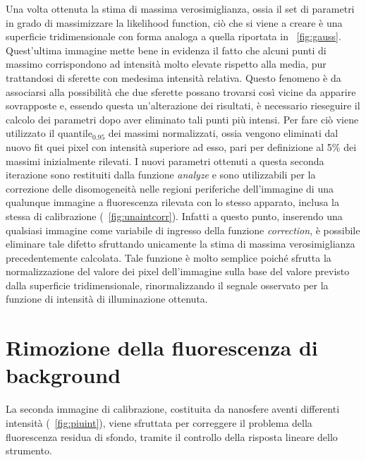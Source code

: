 Una volta ottenuta la stima di massima verosimiglianza, ossia il set di parametri in grado di massimizzare la likelihood function, ciò che si viene a creare è una superficie tridimensionale con forma analoga a quella riportata in \figurename~\ref{fig:gauss}. 
Quest'ultima immagine mette bene in evidenza il fatto che alcuni punti di massimo corrispondono ad intensità molto elevate rispetto alla media, pur trattandosi di sferette con medesima intensità relativa.
Questo fenomeno è da associarsi alla possibilità che due sferette possano trovarsi così vicine da apparire sovrapposte e, essendo questa un'alterazione dei risultati, è necessario rieseguire il calcolo dei parametri dopo aver eliminato tali punti più intensi. 
Per fare ciò viene utilizzato il quantile$_{0.95}$ dei massimi normalizzati, ossia vengono eliminati dal nuovo fit quei pixel con intensità superiore ad esso, pari per definizione al 5\% dei massimi inizialmente rilevati.
I nuovi parametri ottenuti a questa seconda iterazione sono restituiti dalla funzione \textit{analyze} e sono utilizzabili per la correzione delle disomogeneità nelle regioni periferiche dell'immagine di una qualunque immagine a fluorescenza rilevata con lo stesso apparato, inclusa la stessa di calibrazione (\figurename~\ref{fig:unaintcorr}).
Infatti a questo punto, inserendo una qualsiasi immagine come variabile di ingresso della funzione \textit{correction}, è possibile eliminare tale difetto sfruttando unicamente la stima di massima verosimiglianza precedentemente calcolata. 
Tale funzione è molto semplice poiché sfrutta la normalizzazione del valore dei pixel dell'immagine sulla base del valore previsto dalla superficie tridimensionale, rinormalizzando il segnale osservato per la funzione di intensità di illuminazione ottenuta.



\section{Rimozione della fluorescenza di background}

La seconda immagine di calibrazione, costituita da nanosfere aventi differenti intensità (\figurename~\ref{fig:piuint}), viene sfruttata per correggere il problema della fluorescenza residua di sfondo, tramite il controllo della risposta lineare dello strumento. 

